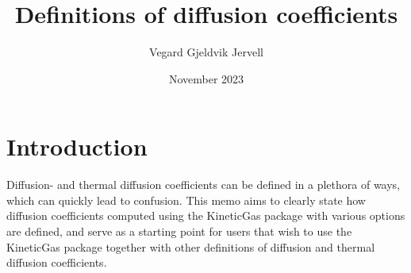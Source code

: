 \documentclass{article}
\title{Definitions of diffusion coefficients}
\author{Vegard Gjeldvik Jervell}
\date{November 2023}
\begin{document}
\maketitle
\tableofcontents

\section{Introduction}
Diffusion- and thermal diffusion coefficients can be defined in a plethora of ways, which can quickly lead to confusion. This memo aims to clearly state how diffusion coefficients computed using the KineticGas package with various options are defined, and serve as a starting point for users that wish to use the KineticGas package together with other definitions of diffusion and thermal diffusion coefficients. 





\clearpage



\end{document}
